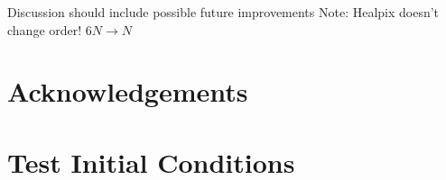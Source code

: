 \documentclass[fleq,usenatbib]{mnras}
\begin{document}
Discussion should include possible future improvements 
Note: Healpix doesn't change order!
$6N \rightarrow N$


\section*{Acknowledgements}\label{sec:ackn}








\appendix
\section{Test Initial Conditions}\label{sec:icnd}
\end{document}
